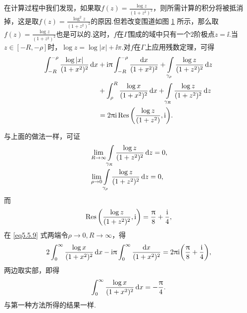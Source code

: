 \begin{solution}
在计算过程中我们发现，如果取$f(z)=\frac{\log z}{(1+z^2)^2}$，则所需计算的积分将被抵消掉，这是取$f(z)=\frac{\log^2z}{(1+z^2)^2}$的原因.但若改变围道如图 \ref{fig5.5} 所示，那么取$f(z)=\frac{\log z}{(1+z^2)^2}$也是可以的.这时，$f$在$\Gamma$围成的域中只有一个$2$阶极点$z=\ii$.当$z\in[-R,-\rho]$时，$\log z=\log |x|+\ii\pi$.对$f$在$\Gamma$上应用残数定理，可得
\begin{equation}\label{eq5.5.9}
\begin{aligned}
\int_{-R}^{-\rho}\frac{\log|x|}{(1+x^2)^2}\mathop{}\!\mathrm dx&+\mathrm i\uppi\int_{-R}^{-\rho}\frac{\mathop{}\!\mathrm dx}{(1+x^2)^2}
+\int\limits_{\gamma_\rho}\frac{\log z}{(1+z^2)^2}\mathop{}\!\mathrm dz\\
&+\int_\rho^R\frac{\log x}{(1+x^2)^2}\mathop{}\!\mathrm dx+\int\limits_{\gamma_R}\frac{\log z}{(1+z^2)^2}\mathop{}\!\mathrm dz\\
&=2\uppi\mathrm i \operatorname*{Res}\bigg(\frac{\log z}{(1+z^2)},\mathrm i\bigg).
\end{aligned}
\end{equation}
\begin{figure}[!ht]
\centering
{}
\caption{\label{fig5.5}}
\end{figure}
与上面的做法一样，可证
\begin{align*}
&\lim_{R\to\infty}\int\limits_{\gamma_R}\frac{\log z}{(1+z^2)^2}\mathop{}\!\mathrm dz=0,\\
&\lim_{\rho\to0}\int\limits_{\gamma_\rho}\frac{\log z}{(1+z^2)^2}\mathop{}\!\mathrm dz=0,
\end{align*}
而
\[\operatorname*{Res}\bigg(\frac{\log z}{(1+z^2)^2},\mathrm i\bigg)=\frac{\uppi}8+\frac{\mathrm i}4,\]
在 \eqref{eq5.5.9} 式两端令$\rho\to0,R\to\infty$，得
\[2\int_0^\infty\frac{\log x}{(1+x^2)^2}\mathop{}\!\mathrm dx-\mathrm i\uppi\int_0^\infty\frac{\mathop{}\!\mathrm dx}{(1+x^2)^2}
=2\uppi\mathrm i\bigg(\frac{\uppi}8+\frac{\mathrm i}4\bigg),\]
两边取实部，即得
\[\int_0^\infty\frac{\log x}{(1+x^2)^2}\mathop{}\!\mathrm dx=-\frac{\uppi}4.\]
与第一种方法所得的结果一样.
\end{solution}

